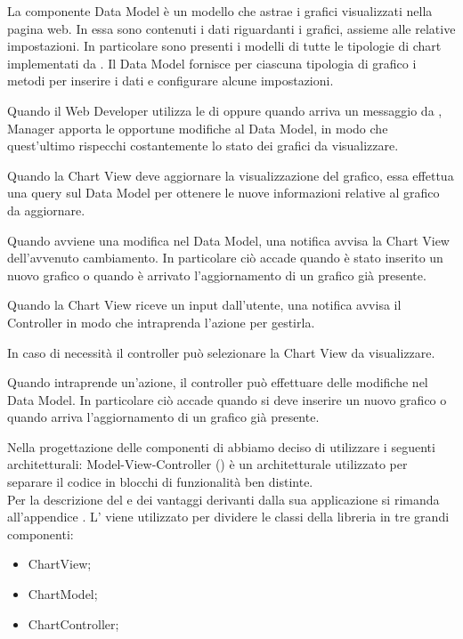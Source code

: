 		La componente Data Model è un modello che astrae i grafici visualizzati nella pagina web. In essa sono contenuti i dati riguardanti i grafici, assieme alle relative impostazioni. In particolare sono presenti i modelli di tutte le tipologie di chart implementati da . Il Data Model fornisce per ciascuna tipologia di grafico i metodi per inserire i dati e configurare alcune impostazioni. 
    
	
		Quando il Web Developer utilizza le  di  oppure quando arriva un messaggio da ,   Manager apporta le opportune modifiche al Data Model, in modo che quest'ultimo rispecchi costantemente lo stato dei grafici da visualizzare.

		Quando la Chart View deve aggiornare la visualizzazione del grafico, essa effettua una query sul Data Model per ottenere le nuove informazioni relative al grafico da aggiornare.

		Quando avviene una modifica nel Data Model, una notifica avvisa la Chart View dell'avvenuto cambiamento. In particolare ciò accade quando è stato inserito un nuovo grafico o quando è arrivato l'aggiornamento di un grafico già presente.

		Quando la Chart View riceve un input dall'utente, una notifica avvisa il Controller in modo che intraprenda l'azione per gestirla.

		In caso di necessità il controller può selezionare la Chart View da visualizzare.
		
		Quando intraprende un'azione, il controller può effettuare delle modifiche nel Data Model. In particolare ciò accade quando si deve inserire un nuovo grafico o quando arriva l'aggiornamento di un grafico già presente.

	Nella progettazione delle componenti di  abbiamo deciso di utilizzare i seguenti  architetturali:
		Model-View-Controller () è un  architetturale utilizzato per separare il codice in blocchi di funzionalità ben distinte.\\
		Per la descrizione del  e dei vantaggi derivanti dalla sua applicazione si rimanda all'appendice .
			L' viene utilizzato per dividere le classi della libreria  in tre grandi componenti:
			\begin{itemize}
				\item ChartView;
				\item ChartModel;
				\item ChartController;
			\end{itemize}
